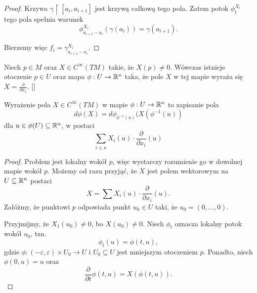\begin{example}
\begin{proof}
      Krzywa $\gamma\restriction[a_i,a_{i+1}]$ jest krzywą całkową tego pola. Zatem potok $\phi_t^{X_i}$ tego pola spełnia warunek
      $$\phi_{a_{i+1}-a_i}^{X_i}(\gamma(a_i))=\gamma(a_{i+1}).$$
      
      Bierzemy więc $f_i=\gamma_{a_{i+1}-a_i}^{X_i}$.
    \end{proof}
  \label{wyprostowanie pola wektorowego}
  \item Niech $p\in M$ oraz $X\in C^\infty(TM)$ takie, że $X(p)\neq 0$. Wówczas istnieje otoczenie $p\in U$ oraz mapa $\phi:U\to \mathbb{R}^n$ taka, że pole $X$ w tej mapie wyraża się $X=\frac{\partial}{\partial x_1}$. []

    Wyrażenie pola $X\in C^\infty(TM)$ w mapie $\phi:U\to\mathbb{R}^n$ to zapisanie pola 
    $$d\phi(X)=d\phi_{\phi^{-1}(u)}(X(\phi^{-1}(u))$$
    dla $u\in\phi(U)\subseteq\mathbb{R}^n$, w postaci
    $$\sum_{i\leq n}X_i(u)\cdot\frac{\partial}{\partial x_i}(u)$$
    
    \begin{proof}
      Problem jest lokalny wokół $p$, więc wystarczy rozumienie go w dowolnej mapie wokół $p$. Możemy od razu przyjąć, że $X$ jest polem wektorowym na $U\subseteq\mathbb{R}^n$ postaci
      $$X=\sum X_i(u)\cdot\frac{\partial}{\partial x_i}(u).$$
      Załóżmy, że punktowi $p$ odpowiada punkt $u_0\in U$ taki, że $u_0=(0,...,0)$.

      Przyjmijmy, że $X_1(u_0)\neq 0$, bo $X(u_0)\neq 0$. Niech $\phi_t$ oznacza lokalny potok wokół $u_0$, tzn.
      $$\phi_t(u)=\phi(t, u),$$
      gdzie $\phi:(-\varepsilon,\varepsilon)\times U_0\to U$ i $U_0\subseteq U$ jest mniejszym otoczeniem $p$. Ponadto, niech $\phi(0,u)=u$ oraz 
      $$\frac{\partial}{\partial t}\phi(t,u)=X(\phi(t,u)).$$


\end{proof}
\end{example}
